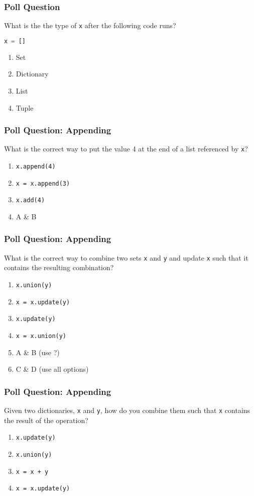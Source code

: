 \documentclass{beamer}
\begin{document}
%
%
\begin{frame}[fragile]
  \frametitle{Poll Question}
  What is the the type of \lstinline|x| after the following code runs?
  \begin{lstlisting}[language=Python, autogobble]
  x = []
  \end{lstlisting}
  \vfill
  \begin{enumerate}[A] 
    \item Set
    \item Dictionary
    \item List
    \item Tuple
  \end{enumerate}
\end{frame}

%
%
\begin{frame}[fragile]
  \frametitle{Poll Question: Appending}
  What is the correct way to put the value 4 at the end of a list referenced by \lstinline|x|?
  \vfill
  \begin{enumerate}[A] 
    \item \lstinline|x.append(4)|
    \item \lstinline|x = x.append(3)|
    \item \lstinline|x.add(4)| 
    \item A \& B
  \end{enumerate}
\end{frame}

%
%
\begin{frame}[fragile]
  \frametitle{Poll Question: Appending}
  What is the correct way to combine two sets \lstinline|x| and \lstinline|y| and update \lstinline|x| such that it contains the resulting combination?
  \vfill
  \begin{enumerate}[A] 
    \item \lstinline|x.union(y)|
    \item \lstinline|x = x.update(y)|
    \item \lstinline|x.update(y)| 
    \item \lstinline|x = x.union(y)|
    \item A \& B (use ?)
    \item C \& D (use all options)
  \end{enumerate}
\end{frame}

%
%
\begin{frame}[fragile]
  \frametitle{Poll Question: Appending}
  Given two dictionaries, \lstinline|x| and \lstinline|y|, how do you combine them such that \lstinline|x| contains the result of the operation?
  \vfill
  \begin{enumerate}[A] 
    \item \lstinline|x.update(y)|
    \item \lstinline|x.union(y)|
    \item \lstinline|x = x + y| 
    \item \lstinline|x = x.update(y)|
  \end{enumerate}
\end{frame}
\end{document}
